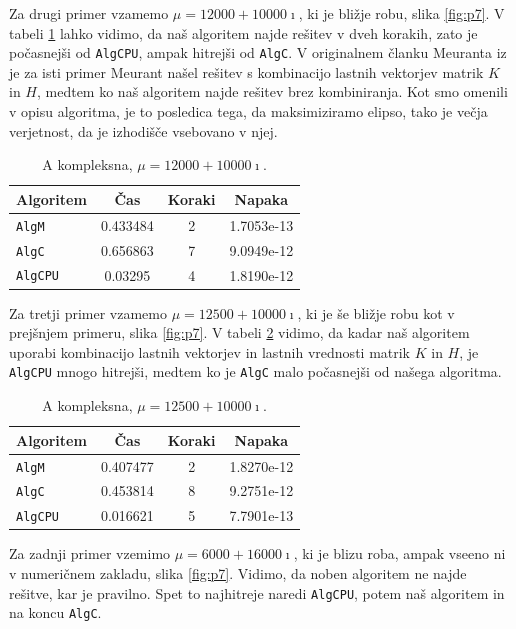 \documentclass[12pt,a4paper]{amsart}
\theoremstyle{definition}
\theoremstyle{plain}
\begin{document}
Za drugi primer vzamemo $\mu = 12000+10000\imath$, ki je bližje robu, slika \ref{fig:p7}. 
V tabeli \ref{t8} lahko vidimo, da naš algoritem najde rešitev v dveh korakih, zato je počasnejši od \verb+AlgCPU+, ampak hitrejši od \verb+AlgC+. 
V originalnem članku Meuranta iz \cite{meurant} je za isti primer Meurant našel rešitev s kombinacijo lastnih vektorjev matrik $K$ in $H$, medtem ko naš algoritem najde rešitev brez kombiniranja. 
Kot smo omenili v opisu algoritma, je to posledica tega, da maksimiziramo elipso, tako je večja verjetnost, da je izhodišče vsebovano v njej.

\begin{table}[H]
\caption{A kompleksna, $\mu = 12000+10000\imath$.}
\begin{tabular}{|l|c|c|c|}
\hline
Algoritem & Čas & Koraki & Napaka\\
\hline
\hline
\verb+AlgM+& 0.433484&2 &1.7053e-13 \\
\hline
\verb+AlgC+ &0.656863&7&9.0949e-12\\
\hline
\verb+AlgCPU+ &0.03295&4&1.8190e-12\\
\hline
\end{tabular}

\label{t8}
\end{table}

Za tretji primer vzamemo $\mu = 12500+10000\imath$, ki je še bližje robu kot v prejšnjem primeru, slika \ref{fig:p7}. 
V tabeli \ref{t9} vidimo, da kadar naš algoritem uporabi kombinacijo lastnih vektorjev in lastnih vrednosti matrik $K$ in $H$, je \verb+AlgCPU+ mnogo hitrejši, medtem ko je \verb+AlgC+ malo počasnejši od našega algoritma.


\begin{table}[H]
\caption{A kompleksna, $\mu = 12500+10000\imath$.}
\begin{tabular}{|l|c|c|c|}
\hline
Algoritem & Čas & Koraki & Napaka\\
\hline
\hline
\verb+AlgM+ &0.407477&2&1.8270e-12\\
\hline
\verb+AlgC+ &0.453814 &8 & 9.2751e-12\\
\hline
\verb+AlgCPU+ &0.016621& 5&7.7901e-13 \\
\hline
\end{tabular}

\label{t9}
\end{table}

Za zadnji primer vzemimo $\mu = 6000+16000\imath$, ki je blizu roba, ampak vseeno ni v numeričnem zakladu, slika \ref{fig:p7}. Vidimo, da noben algoritem ne najde rešitve, kar je pravilno. Spet to najhitreje naredi \verb+AlgCPU+, potem naš algoritem in na koncu \verb+AlgC+.
\end{document}
